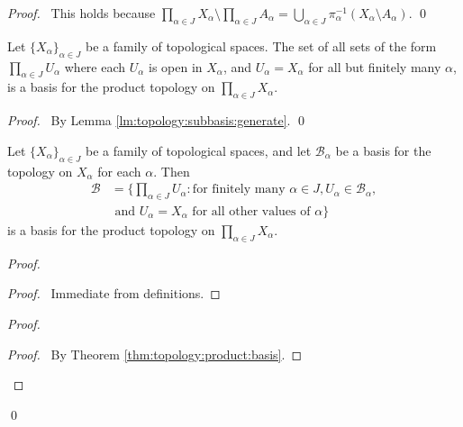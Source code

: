 \begin{proof}
  \pf\ This holds because $\prod_{\alpha \in J} X_\alpha \setminus
  \prod_{\alpha \in J} A_\alpha = \bigcup_{\alpha \in J}
  \pi_\alpha^{-1}(X_\alpha \setminus A_\alpha)$. \qed
\end{proof}

\begin{thm}
  \label{thm:topology:product:basis}
  Let $\{ X_\alpha \}_{\alpha \in J}$ be a family of topological spaces.
  The set of all sets of the form $\prod_{\alpha \in J} U_\alpha$ where each
  $U_\alpha$ is open in $X_\alpha$, and $U_\alpha = X_\alpha$ for all but
  finitely many $\alpha$, is a basis for the product topology on
  $\prod_{\alpha
    \in J} X_\alpha$.
\end{thm}

\begin{proof}
  \pf\ By Lemma \ref{lm:topology:subbasis:generate}. \qed
\end{proof}

\begin{thm}
  Let $\{X_\alpha\}_{\alpha \in J}$ be a family of topological spaces, and
  let $\mathcal{B}_\alpha$ be a basis for the topology on $X_\alpha$ for each
  $\alpha$. Then
  \begin{align*}
    \mathcal{B} & = \{ \prod_{\alpha \in J} U_\alpha : \text{for finitely
      many
    } \alpha \in J, U_\alpha \in \mathcal{B}_\alpha,  \\
    &  \text{ and } U_\alpha =
    X_\alpha \text{ for all other values of } \alpha \}
  \end{align*}
  is a basis for the product topology on $\prod_{\alpha \in J} X_\alpha$.
\end{thm}

\begin{proof}
  \pf
  \begin{proof}
    \pf\ Immediate from definitions.
  \end{proof}
  \begin{proof}
    \begin{proof}
      \pf\ By Theorem \ref{thm:topology:product:basis}.
    \end{proof}
  \end{proof}
  \qed
\end{proof}

